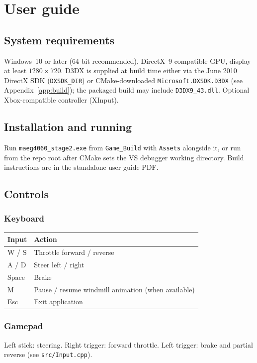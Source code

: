 \documentclass[11pt,a4paper]{article}
\begin{document}
\section{User guide}
\label{sec:user-guide}

\subsection{System requirements}
Windows~10 or later (64-bit recommended), DirectX~9 compatible GPU, display at least $1280\times720$. D3DX is supplied at build time either via the June 2010 DirectX SDK (\texttt{DXSDK\_DIR}) or CMake-downloaded \texttt{Microsoft.DXSDK.D3DX} (see Appendix~\ref{app:build}); the packaged build may include \texttt{D3DX9\_43.dll}. Optional Xbox-compatible controller (XInput).

\subsection{Installation and running}
Run \texttt{maeg4060\_stage2.exe} from \texttt{Game\_Build} with \texttt{Assets} alongside it, or run from the repo root after CMake sets the VS debugger working directory. Build instructions are in the standalone user guide PDF.

\subsection{Controls}
\label{sec:user-controls}

\subsubsection{Keyboard}
\begin{tabular}{@{}ll@{}}
  \toprule
  \textbf{Input} & \textbf{Action} \\
  \midrule
  W / S & Throttle forward / reverse \\
  A / D & Steer left / right \\
  Space & Brake \\
  M & Pause / resume windmill animation (when available) \\
  Esc & Exit application \\
  \bottomrule
\end{tabular}

\subsubsection{Gamepad}
Left stick: steering. Right trigger: forward throttle. Left trigger: brake and partial reverse (see \texttt{src/Input.cpp}).
\end{document}
